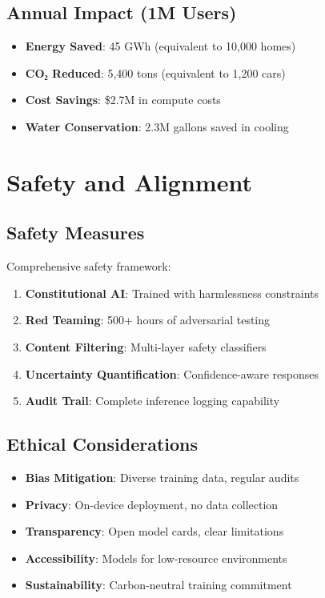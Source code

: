\documentclass[11pt,a4paper]{article}
\begin{document}
\subsection{Annual Impact (1M Users)}
\begin{itemize}
    \item \textbf{Energy Saved}: 45 GWh (equivalent to 10,000 homes)
    \item \textbf{CO₂ Reduced}: 5,400 tons (equivalent to 1,200 cars)
    \item \textbf{Cost Savings}: \$2.7M in compute costs
    \item \textbf{Water Conservation}: 2.3M gallons saved in cooling
\end{itemize}

\section{Safety and Alignment}

\subsection{Safety Measures}

Comprehensive safety framework:
\begin{enumerate}
    \item \textbf{Constitutional AI}: Trained with harmlessness constraints
    \item \textbf{Red Teaming}: 500+ hours of adversarial testing
    \item \textbf{Content Filtering}: Multi-layer safety classifiers
    \item \textbf{Uncertainty Quantification}: Confidence-aware responses
    \item \textbf{Audit Trail}: Complete inference logging capability
\end{enumerate}

\subsection{Ethical Considerations}

\begin{itemize}
    \item \textbf{Bias Mitigation}: Diverse training data, regular audits
    \item \textbf{Privacy}: On-device deployment, no data collection
    \item \textbf{Transparency}: Open model cards, clear limitations
    \item \textbf{Accessibility}: Models for low-resource environments
    \item \textbf{Sustainability}: Carbon-neutral training commitment
\end{itemize}
\end{document}
